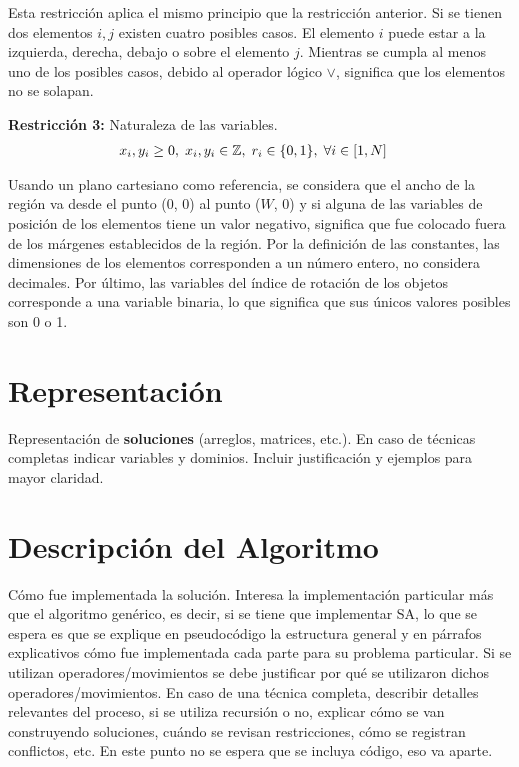 \documentclass[letter, 10pt]{article}
\begin{document}
Esta restricci\'on aplica el mismo principio que la restricci\'on anterior. Si se tienen dos elementos $i, j$ existen cuatro posibles casos. El elemento $i$ puede estar a la izquierda, derecha, debajo o sobre el elemento $j$. Mientras se cumpla al menos uno de los posibles casos, debido al operador l\'ogico $\vee$, significa que los elementos no se solapan.

\vspace{0.2cm}
\textbf{Restricci\'on 3:} Naturaleza de las variables.
\begin{align}
    & x_{i}, y_{i} \geq 0, \hspace{0.1cm} x_{i}, y_{i} \in \mathbb{Z}, \hspace{0.1cm} r_{i} \in \{0,1\}, \hspace{0.1cm} \forall i \in [1,N] &
\end{align}

Usando un plano cartesiano como referencia, se considera que el ancho de la regi\'on va desde el punto (0, 0) al punto ($W$, 0) y si alguna de las variables de posici\'on de los elementos tiene un valor negativo, significa que fue colocado fuera de los m\'argenes establecidos de la regi\'on. Por la definici\'on de las constantes, las dimensiones de los elementos corresponden a un n\'umero entero, no considera decimales. Por \'ultimo, las variables del \'indice de rotaci\'on de los objetos corresponde a una variable binaria, lo que significa que sus \'unicos valores posibles son 0 o 1.

\section{Representaci\'on}
Representaci\'on de \textbf{soluciones} (arreglos, matrices, etc.). En caso de t\'ecnicas completas indicar variables y dominios. Incluir justificaci\'on y ejemplos para mayor claridad.

\section{Descripci\'on del Algoritmo}

C\'omo fue implementada la soluci\'on. Interesa la implementaci\'on particular m\'as que el algoritmo gen\'erico, es decir, si se tiene que implementar SA, lo que se espera es que se explique en pseudoc\'odigo la estructura general y en p\'arrafos explicativos c\'omo fue implementada cada parte para su problema particular. Si se utilizan operadores/movimientos se debe justificar por qu\'e se utilizaron dichos operadores/movimientos. En caso de una t\'ecnica completa, describir detalles relevantes del proceso, si se utiliza recursi\'on o no, explicar c\'omo se van construyendo soluciones, cu\'ando se revisan restricciones, c\'omo se registran conflictos, etc. En este punto no se espera que se incluya c\'odigo, eso va aparte.
\end{document}
